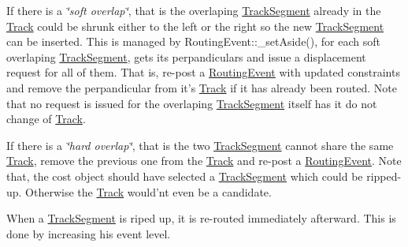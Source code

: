 \begin{DoxyEnumerate}
\begin{DoxyItemize}
If there is a {\itshape \char`\"{}soft overlap\char`\"{}}, that is the overlaping {\ttfamily \hyperlink{classKite_1_1TrackSegment}{Track\-Segment}} already in the {\ttfamily \hyperlink{classKite_1_1Track}{Track}} could be shrunk either to the left or the right so the new {\ttfamily \hyperlink{classKite_1_1TrackSegment}{Track\-Segment}} can be inserted. This is managed by {\ttfamily Routing\-Event\-::\-\_\-set\-Aside()}, for each soft overlaping {\ttfamily \hyperlink{classKite_1_1TrackSegment}{Track\-Segment}}, gets its perpandiculars and issue a displacement request for all of them. That is, re-\/post a {\ttfamily \hyperlink{classKite_1_1RoutingEvent}{Routing\-Event}} with updated constraints and remove the perpandicular from it's \hyperlink{classKite_1_1Track}{Track} if it has already been routed. Note that no request is issued for the overlaping {\ttfamily \hyperlink{classKite_1_1TrackSegment}{Track\-Segment}} itself has it do not change of \hyperlink{classKite_1_1Track}{Track}.

If there is a {\itshape \char`\"{}hard overlap\char`\"{}}, that is the two {\ttfamily \hyperlink{classKite_1_1TrackSegment}{Track\-Segment}} cannot share the same {\ttfamily \hyperlink{classKite_1_1Track}{Track}}, remove the previous one from the {\ttfamily \hyperlink{classKite_1_1Track}{Track}} and re-\/post a {\ttfamily \hyperlink{classKite_1_1RoutingEvent}{Routing\-Event}}. Note that, the cost object should have selected a {\ttfamily \hyperlink{classKite_1_1TrackSegment}{Track\-Segment}} which could be ripped-\/up. Otherwise the {\ttfamily \hyperlink{classKite_1_1Track}{Track}} would'nt even be a candidate. 
\end{DoxyItemize}

When a \hyperlink{classKite_1_1TrackSegment}{Track\-Segment} is riped up, it is re-\/routed immediately afterward. This is done by increasing his event level. 
\end{DoxyEnumerate}